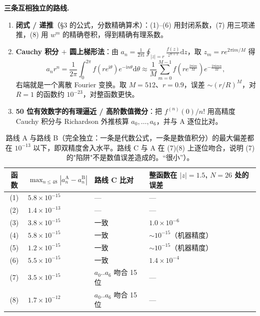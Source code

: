 \documentclass[11pt,a4paper]{ctexart}
\theoremstyle{definition}
\newcommand{\dd}{\mathrm{d}}
\newcommand{\ii}{\mathrm{i}}
\begin{document}
\textbf{三条互相独立的路线.}
\begin{enumerate}[leftmargin=1.8em,itemsep=0.2ex,topsep=0.3ex]
\item[\textbf{A}] \textbf{闭式 / 递推}（\S3 的公式，分数精确算术）：(1)--(6) 用封闭系数，(7) 用三项递推，(8) 用 $w^m$ 的精确卷积，得到精确有理系数。
\item[\textbf{B}] \textbf{Cauchy 积分 $+$ 圆上梯形法}：由 $a_n=\frac{1}{2\pi\ii}\oint_{|z|=r}\frac{f(z)}{z^{n+1}}\dd z$，取 $z_m=re^{2\pi\ii m/M}$ 得
\[
a_nr^n=\frac1{2\pi}\int_0^{2\pi}\!f(re^{\ii\theta})e^{-\ii n\theta}\dd\theta
\approx\frac1M\sum_{m=0}^{M-1}f\!\left(re^{\frac{2\pi\ii m}{M}}\right)e^{-\frac{2\pi\ii mn}{M}},
\]
右端就是一个离散 Fourier 变换。取 $M=512$、$r=0.9$，误差 $\sim(r/R)^M$，对 $R=1$ 的函数约 $10^{-23}$，对整函数更快。
\item[\textbf{C}] \textbf{50 位有效数字的有理逼近 / 高阶数值微分}：把 $f^{(n)}(0)/n!$ 用高精度 Cauchy 积分与 Richardson 外推核算 $a_0,\dots,a_6$，并与 A 逐位比对。
\end{enumerate}

\begin{table}[H]
\centering
\small
\setlength{\tabcolsep}{5pt}
\renewcommand{\arraystretch}{1.2}
\begin{tabular}{@{}c >{\raggedright\arraybackslash}p{4.4cm} >{\raggedright\arraybackslash}p{2.3cm} >{\raggedright\arraybackslash}p{5.6cm}@{}}
\toprule
\textbf{函数} & $\max_{n\le48}|a_n^{\mathrm{A}}-a_n^{\mathrm{B}}|$ & \textbf{路线 C 比对} & \textbf{整函数在 $|z|=1.5$, $N=26$ 处的误差}\\
\midrule
(1) & $5.8\times10^{-15}$ & --- & ---\\
(2) & $1.4\times10^{-13}$ & --- & ---\\
(3) & $3.8\times10^{-15}$ & 一致 & $1.0\times10^{-6}$\\
(4) & $5.8\times10^{-15}$ & 一致 & $\sim10^{-15}$（机器精度）\\
(5) & $1.2\times10^{-15}$ & 一致 & $\sim10^{-15}$（机器精度）\\
(6) & $5.5\times10^{-15}$ & 一致 & $1.4\times10^{-4}$\\
(7) & $3.5\times10^{-15}$ & $a_0..a_6$ 吻合 15 位 & ---\\
(8) & $1.7\times10^{-12}$ & $a_0..a_6$ 吻合 15 位 & ---\\
\bottomrule
\end{tabular}
\caption{路线 A 与路线 B（完全独立：一条是代数公式，一条是数值积分）的最大偏差都在 $10^{-13}$ 以下，即双精度舍入水平。路线 C 与 A 在 (7)(8) 上逐位吻合，说明 (7) 的"陷阱"不是数值误差造成的。“很小”）。}
\end{table}
\end{document}
